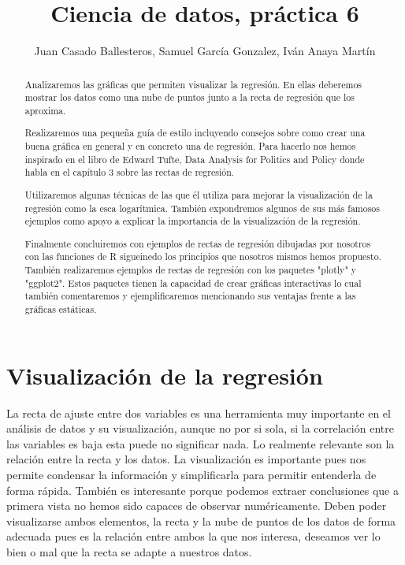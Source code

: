 \documentclass [a4paper] {article}
\title{Ciencia de datos, práctica 6}
\author{Juan Casado Ballesteros, Samuel García Gonzalez, Iván Anaya Martín}
\begin{document}
\maketitle

\begin{abstract}
Analizaremos las gráficas que permiten visualizar la regresión.
En ellas deberemos mostrar los datos como una nube de puntos junto a la recta de regresión que los aproxima.

Realizaremos una pequeña guía de estilo incluyendo consejos sobre como crear una buena gráfica en general y en concreto una de regresión.
Para hacerlo nos hemos inspirado en el libro de Edward Tufte, Data Analysis for Politics and Policy donde habla en el capítulo 3 sobre las rectas de regresión.

Utilizaremos algunas técnicas de las que él utiliza para mejorar la visualización de la regresión como la esca logarítmica.
También expondremos algunos de sus más famosos ejemplos como apoyo a explicar la importancia de la visualización de la regresión.

Finalmente concluiremos con ejemplos de rectas de regresión dibujadas por nosotros con las funciones de R sigueinedo los principios que nosotros mismos hemos propuesto.
También realizaremos ejemplos de rectas de regresión con los paquetes "plotly" y "ggplot2".
Estos paquetes tienen la capacidad de crear gráficas interactivas lo cual también comentaremos y ejemplificaremos mencionando sus ventajas frente a las gráficas estáticas.
\end{abstract}

\tableofcontents


\newpage
\section{Visualización de la regresión}
La recta de ajuste entre dos variables es una herramienta muy importante en el análisis de datos y su visualización, aunque no por si sola,
si la correlación entre las variables es baja esta puede no significar nada.
Lo realmente relevante son la relación entre la recta y los datos. 
La visualización es importante pues nos permite condensar la información y simplificarla para permitir entenderla de forma rápida.
También es interesante porque podemos extraer conclusiones que a primera vista no hemos sido capaces de observar numéricamente. 
Deben poder visualizarse ambos elementos, la recta y la nube de puntos de los datos de forma adecuada pues es la relación entre ambos la que nos interesa, deseamos ver lo bien o mal que la recta se adapte a nuestros datos.
\end{document}
